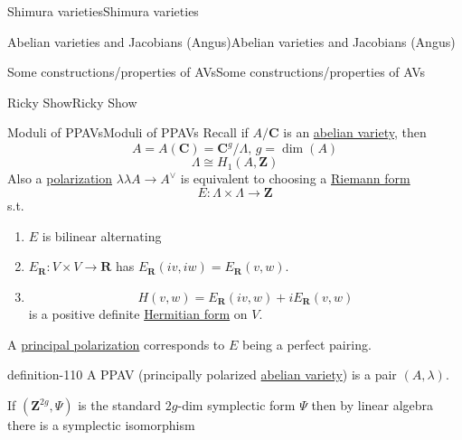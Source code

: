 \documentclass[10pt,]{book}
\numberwithin{equation}{section}
\newcommand{\ZZ}{\mathbf{Z}}
\newcommand{\RR}{\mathbf{R}}
\newcommand{\CC}{\mathbf{C}}
\begin{document}
\begin{chapterptx}{Shimura varieties}{}{Shimura varieties}{}{}
\begin{sectionptx}{Abelian varieties and Jacobians (Angus)}{}{Abelian varieties and Jacobians (Angus)}{}{}
\begin{subsectionptx}{Some constructions/properties of AVs}{}{Some constructions/properties of AVs}{}{}
\end{subsectionptx}
\end{sectionptx}
%
%
\typeout{************************************************}
\typeout{************************************************}
%
\begin{sectionptx}{Ricky Show}{}{Ricky Show}{}{}\label{sec-buntes-hs}
%
%
\typeout{************************************************}
\typeout{************************************************}
%
\begin{subsectionptx}{Moduli of PPAVs}{}{Moduli of PPAVs}{}{}\label{subsection-82}
\hypertarget{p-1124}{}%
Recall if \(A/ \CC\) is an \hyperref[def-buntes-abvar]{abelian variety},  then%
\begin{equation*}
A = A(\CC) =  \CC^g/ \Lambda, \,g = \dim (A)
\end{equation*}
%
\begin{equation*}
\Lambda \cong H_1(A,\ZZ)
\end{equation*}
Also a \hyperref[def-polarization]{polarization} \(\lambda \lambda A \to A^\vee\) is equivalent to choosing a \hyperref[def-riemann-form]{Riemann form}%
\begin{equation*}
E \colon \Lambda \times \Lambda \to \ZZ
\end{equation*}
s.t.\leavevmode%
\begin{enumerate}
\item\hypertarget{li-278}{}\(E\) is bilinear alternating%
\item\hypertarget{li-279}{}\(E_\RR \colon V\times V \to \RR\) has \(E_\RR(iv,iw)  = E_\RR( v,w)\).%
\item\hypertarget{li-280}{}%
\begin{equation*}
H(v,w) = E_\RR(iv, w) + i E_\RR(v,w)
\end{equation*}
is a positive definite \hyperref[sec-buntes-av-jac]{Hermitian form} on \(V\).%
\end{enumerate}
A \hyperref[def-polarization]{principal polarization} corresponds to \(E\) being a perfect pairing.%
\begin{definition}{}{definition-110}%
\hypertarget{p-1125}{}%
A PPAV (principally polarized \hyperref[def-buntes-abvar]{abelian variety}) is a pair \((A,\lambda)\).%
\end{definition}
\hypertarget{p-1126}{}%
If \((\ZZ^{2g}, \Psi)\) is the standard \(2g\)-dim symplectic form \(\Psi\) then by linear algebra there is a symplectic isomorphism%
\begin{equation*}

\end{equation*}
\end{subsectionptx}
\end{sectionptx}
\end{chapterptx}
\end{document}
